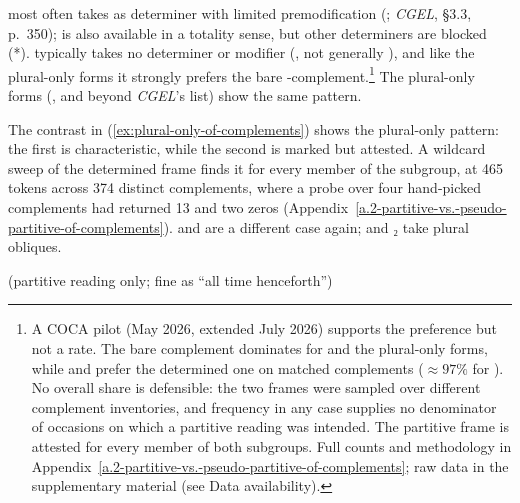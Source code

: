  most often takes  as determiner with limited premodification (; \textit{CGEL}, §3.3, p.~350);  is also available in a totality sense, but other determiners are blocked (*).  typically takes no determiner or modifier (, not generally ), and like the plural-only forms it strongly prefers the bare -complement.\footnote{A COCA pilot (May 2026, extended July 2026) supports the preference but not a rate. The bare complement dominates for  and the plural-only forms, while  and  prefer the determined one on matched complements ($\approx\!97\%$ for ). No overall share is defensible: the two frames were sampled over different complement inventories, and frequency in any case supplies no denominator of occasions on which a partitive reading was intended. The partitive frame is attested for every member of both subgroups. Full counts and methodology in Appendix~\ref{a.2-partitive-vs.-pseudo-partitive-of-complements}; raw data in the supplementary material (see Data availability).} The plural-only forms (, and  beyond \textit{CGEL}'s list) show the same pattern.

\ea\label{ex:plural-only-of-complements}
\ea {}
\ex {}
\z
\z

The contrast in (\ref{ex:plural-only-of-complements}) shows the plural-only pattern: the first is characteristic, while the second is marked but attested. A wildcard sweep of the determined frame finds it for every member of the subgroup, at 465 tokens across 374 distinct complements, where a probe over four hand-picked complements had returned 13 and two zeros (Appendix~\ref{a.2-partitive-vs.-pseudo-partitive-of-complements}).  and  are a different case again;  and ₂ take plural obliques.

\ea\label{ex:partitive-plural-oblique}
\ea {}
\ex {} (partitive reading only; fine as \enquote{all time henceforth})
\ex {}
\ex {}
\ex {}
\z
\z

